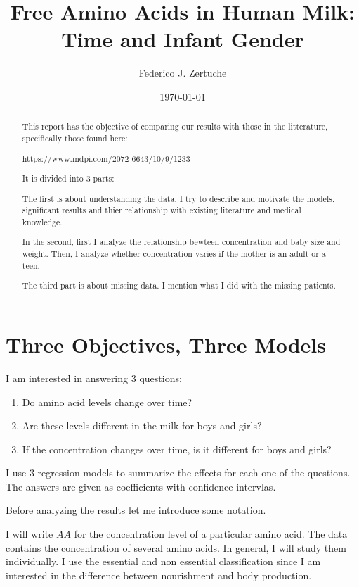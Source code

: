 \documentclass[12pt]{article}
\title{Free Amino Acids in Human Milk: Time and Infant Gender}
\author{Federico J. Zertuche}
\date{\today}
\begin{document}
\maketitle

\begin{abstract}
This report has the objective of comparing our results with those in the litterature, specifically those found here:

\begin{center}
  \href{https://www.mdpi.com/2072-6643/10/9/1233}{https://www.mdpi.com/2072-6643/10/9/1233}
\end{center}

It is divided into $3$ parts:

The first is about understanding the data. I try to describe and motivate the models, significant results and thier relationship with existing literature and medical knowledge.

In the second, first I analyze the relationship bewteen concentration and baby size and weight. Then, I analyze whether concentration varies if the mother is an adult or a teen.

The third part is about missing data. I mention what I did with the missing patients.

\end{abstract}

\part{Three Objectives, Three Models}

I am interested in answering $3$ questions:

\begin{enumerate}
  \item Do amino acid levels change over time?
  \item Are these levels different in the milk for boys and girls?
  \item If the concentration changes over time, is it different for boys and girls?
\end{enumerate}

I use $3$ regression models to summarize the effects for each one of the questions. The answers are given as coefficients with confidence intervlas.

Before analyzing the results let me introduce some notation.

I will write $AA$ for the concentration level of a particular amino acid. The data contains the concentration of several amino acids. In general, I will study them individually. I use the essential and non essential classification since I am interested in the difference between nourishment and body production.
\end{document}
